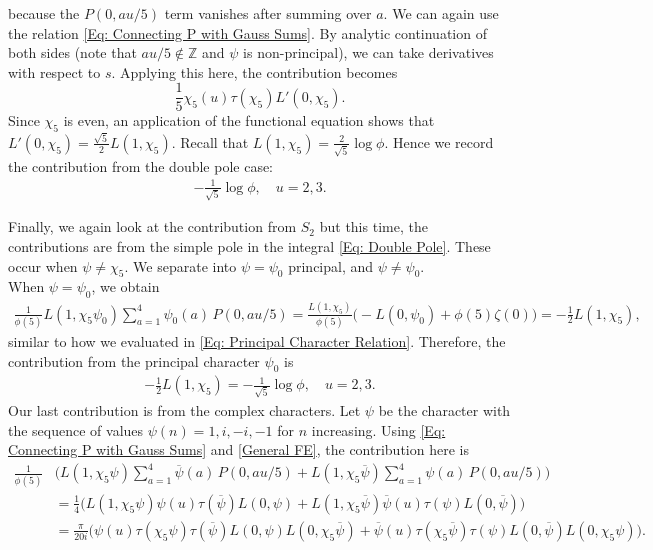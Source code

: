 \documentclass[11pt]{amsart}
\numberwithin{equation}{section}
\newcommand{\ol}{\overline}
\theoremstyle{remark}
\begin{document}
because the $P(0,au/5)$ term vanishes after summing over $a$. We can again use the relation \eqref{Eq: Connecting P with Gauss Sums}. By analytic continuation of both sides (note that $au/5 \notin \mathbb{Z}$ and $\psi$ is non-principal), we can take derivatives with respect to $s$. Applying this here, the contribution becomes
\[
\frac{1}{5} \chi_5(u)\tau(\chi_5)L'(0,\chi_5).
\]
Since $\chi_5$ is even, an application of the functional equation shows that $L'(0,\chi_5) =\tfrac{\sqrt{5}}{2}L(1,\chi_5)$. Recall that $L(1,\chi_5) = \tfrac{2}{\sqrt{5}}\log \phi$. Hence we record the contribution from the double pole case:
\begin{align}\label{Contribution 3}
-\frac{1}{\sqrt{5}}\log \phi, \quad u=2,3.
\end{align}
\par
Finally, we again look at the contribution from $S_2$ but this time, the contributions are from the simple pole in the integral \eqref{Eq: Double Pole}. These occur when $\psi \neq \chi_5$. We separate into $\psi = \psi_0$ principal, and $\psi \neq \psi_0$.\\
When $\psi = \psi_0$, we obtain 
\begin{align*}
    \frac{1}{\phi(5)} L(1,\chi_5 \psi_0) \sum_{a=1}^{4} \psi_0(a)\, P(0,au/5)= \frac{L(1,\chi_5)}{\phi(5)} \bigg(-L(0,\psi_0) + \phi(5) \zeta(0)\bigg) =- \frac{1}{2} L(1,\chi_5),
\end{align*}
similar to how we evaluated in \eqref{Eq: Principal Character Relation}. Therefore, the contribution from the principal character $\psi_0$ is
\begin{align}\label{Eq: Contribution 4}
   - \frac{1}{2} L(1,\chi_5) = -\frac{1}{\sqrt{5}}\log \phi, \quad u=2,3. 
\end{align}
Our last contribution is from the complex characters. Let $\psi$ be the character with the sequence of values $\psi(n)=1,i,-i,-1$ for $n$ increasing. Using \eqref{Eq: Connecting P with Gauss Sums} and \eqref{General FE}, the contribution here is
\begin{align*}
\frac{1}{\phi(5)} &\bigg( L(1,\chi_5 \psi)\sum_{a=1}^{4} \overline{\psi}(a) \, P(0,au/5) + L(1,\chi_5 \overline{\psi})\sum_{a=1}^{4} \psi(a) \, P(0,au/5) \bigg) \\
&= \frac{1}{4} \bigg( L(1,\chi_5 \psi)\psi(u)\tau(\ol{\psi})L(0,\psi) + L(1,\chi_5 \overline{\psi})\ol{\psi}(u)\tau({\psi})L(0,\ol{\psi}) \bigg) \\
&= \frac{\pi}{20i} \bigg( \psi(u) \tau(\chi_5 \psi)\tau(\ol{\psi})L(0,\psi) L(0,\chi_5 \ol{\psi}) + \ol{\psi}(u)\tau(\chi_5\ol{\psi})\tau({\psi})L(0,\ol{\psi}) L(0,\chi_5 \psi) \bigg).
\end{align*}
\end{document}
